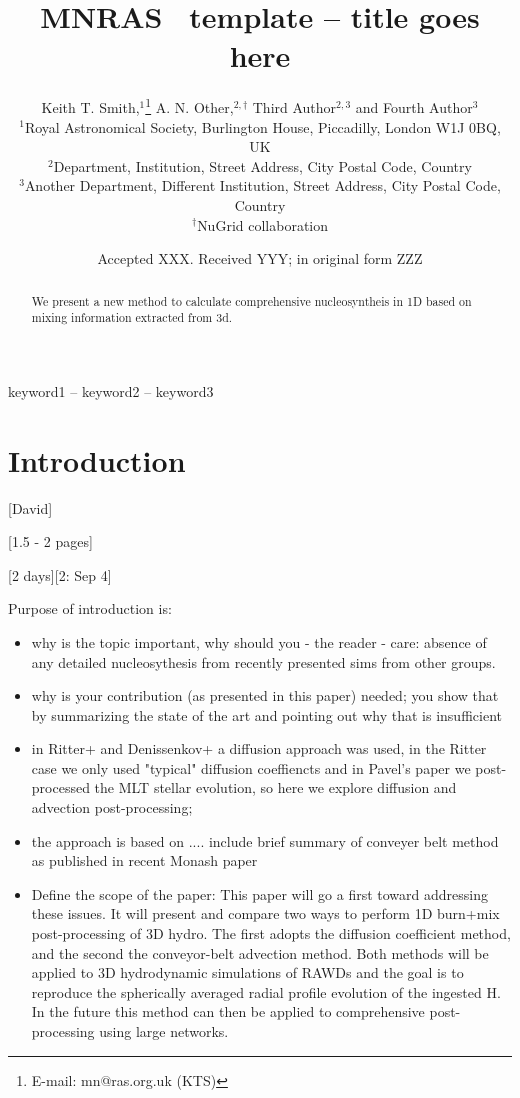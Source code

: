 \documentclass[fleqn,usenatbib]{mnras}
\title[Short title, max. 45 characters]{MNRAS \LaTeXe\ template -- title goes here}
\author[K. T. Smith et al.]{
Keith T. Smith,$^{1}$\thanks{E-mail: mn@ras.org.uk (KTS)}
A. N. Other,$^{2,\dagger}$
Third Author$^{2,3}$
and Fourth Author$^{3}$
\\
$^{1}$Royal Astronomical Society, Burlington House, Piccadilly, London W1J 0BQ, UK\\
$^{2}$Department, Institution, Street Address, City Postal Code, Country\\
$^{3}$Another Department, Different Institution, Street Address, City Postal Code, Country\\
$^\dagger$NuGrid collaboration}
\date{Accepted XXX. Received YYY; in original form ZZZ}
\begin{document}
\label{firstpage}
\pagerange{\pageref{firstpage}--\pageref{lastpage}}
\maketitle

\begin{abstract}
We present a new method to calculate comprehensive nucleosyntheis in 1D based on mixing information extracted from 3d.


\end{abstract}

\begin{keywords}
keyword1 -- keyword2 -- keyword3
\end{keywords}



\section{Introduction}

[David]

[1.5 - 2 pages]

[2 days][2: Sep 4]

Purpose of introduction is:
\begin{itemize}
\item why is the topic important, why should you - the reader - care: absence of any detailed nucleosythesis from recently presented sims from other groups.
\item why is your contribution (as presented in this paper) needed; you show that by summarizing the state of the art and pointing out why that is insufficient
\item in Ritter+ and Denissenkov+ a diffusion approach was used, in the Ritter case we only used "typical" diffusion coeffiencts and in Pavel's paper we post-processed the MLT stellar evolution, so here we explore diffusion and advection post-processing; 
\item the approach is based on .... include brief summary of conveyer belt method as published in recent Monash paper
\item Define the scope of the paper: This paper will go a first toward addressing these issues. It will present and compare two ways to perform 1D burn+mix  post-processing of 3D hydro. The first adopts the diffusion coefficient method, and the second the conveyor-belt advection method. Both methods will be applied to 3D hydrodynamic simulations of RAWDs and the goal is to reproduce the spherically averaged radial profile evolution of the ingested H. In the future this method can then be applied to comprehensive post-processing using large networks.
\end{itemize}
\end{document}
